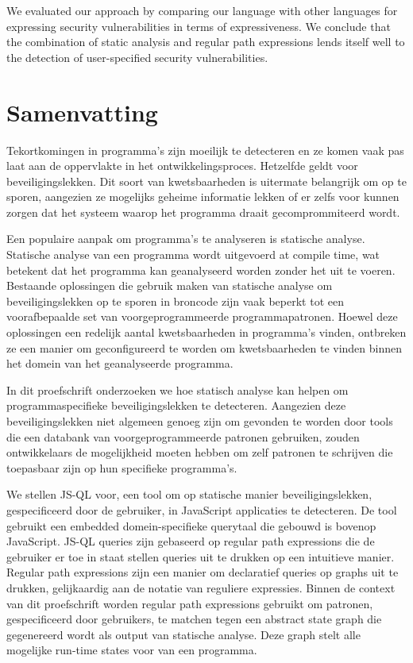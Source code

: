 \documentclass[a4paper, 12pt]{report}
\theoremstyle{definition}
\begin{document}
We evaluated our approach by comparing our language with other languages for expressing security vulnerabilities in terms of expressiveness. We conclude that the combination of static analysis and regular path expressions lends itself well to the detection of user-specified security vulnerabilities.

\chapter*{Samenvatting}

Tekortkomingen in programma's zijn moeilijk te detecteren en ze komen vaak pas laat aan de oppervlakte in het ontwikkelingsproces. Hetzelfde geldt voor beveiligingslekken. Dit soort van kwetsbaarheden is uitermate belangrijk om op te sporen, aangezien ze mogelijks geheime informatie lekken of er zelfs voor kunnen zorgen dat het systeem waarop het programma draait gecomprommiteerd wordt.
 
Een populaire aanpak om programma's te analyseren is statische analyse. Statische analyse van een programma wordt uitgevoerd at compile time, wat betekent dat het programma kan geanalyseerd worden zonder het uit te voeren. Bestaande oplossingen die gebruik maken van statische analyse om beveiligingslekken op te sporen in broncode zijn vaak beperkt tot een voorafbepaalde set van voorgeprogrammeerde programmapatronen. Hoewel deze oplossingen een redelijk aantal kwetsbaarheden in programma's vinden, ontbreken ze een manier om geconfigureerd te worden om kwetsbaarheden te vinden binnen het domein van het geanalyseerde programma.

In dit proefschrift onderzoeken we hoe statisch analyse kan helpen om programmaspecifieke beveiligingslekken te detecteren. Aangezien deze beveiligingslekken niet algemeen genoeg zijn om gevonden te worden door tools die een databank van voorgeprogrammeerde patronen gebruiken, zouden ontwikkelaars de mogelijkheid moeten hebben om zelf patronen te schrijven die toepasbaar zijn op hun specifieke programma's.

\begin{sloppypar}
We stellen JS-QL voor, een tool om op statische manier beveiligingslekken, gespecificeerd door de gebruiker, in JavaScript applicaties te detecteren. De tool gebruikt een embedded domein-specifieke querytaal die gebouwd is bovenop JavaScript. JS-QL queries zijn gebaseerd op regular path expressions die de gebruiker er toe in staat stellen queries uit te drukken op een intuitieve manier. Regular path expressions zijn een manier om declaratief queries op graphs uit te drukken, gelijkaardig aan de notatie van reguliere expressies. Binnen de context van dit proefschrift worden regular path expressions gebruikt om patronen, gespecificeerd door gebruikers, te matchen tegen een abstract state graph die gegenereerd wordt als output van statische analyse. Deze graph stelt alle mogelijke run-time states voor van een programma.
\end{sloppypar}
\end{document}
